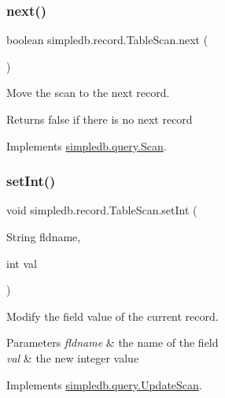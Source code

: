 \subsubsection{\texorpdfstring{next()}{next()}}
{\footnotesize\ttfamily boolean simpledb.\+record.\+Table\+Scan.\+next (\begin{DoxyParamCaption}{ }\end{DoxyParamCaption})\hspace{0.3cm}{\ttfamily [inline]}}

Move the scan to the next record. \begin{DoxyReturn}{Returns}
false if there is no next record 
\end{DoxyReturn}


Implements \hyperlink{interfacesimpledb_1_1query_1_1Scan_a5fc77b7c76d91f89f6c09ac4f15ef351}{simpledb.\+query.\+Scan}.

\mbox{\label{classsimpledb_1_1record_1_1TableScan_af36f97fd4163b889c0e3d76a824406c2}} 
\subsubsection{\texorpdfstring{set\+Int()}{setInt()}}
{\footnotesize\ttfamily void simpledb.\+record.\+Table\+Scan.\+set\+Int (\begin{DoxyParamCaption}\item[{String}]{fldname,  }\item[{int}]{val }\end{DoxyParamCaption})\hspace{0.3cm}{\ttfamily [inline]}}

Modify the field value of the current record. 
\begin{DoxyParams}{Parameters}
{\em fldname} & the name of the field \\
\hline
{\em val} & the new integer value \\
\hline
\end{DoxyParams}


Implements \hyperlink{interfacesimpledb_1_1query_1_1UpdateScan_ad866b1c21bbe8f0442a8779a6240c069}{simpledb.\+query.\+Update\+Scan}.

\mbox{\label{classsimpledb_1_1record_1_1TableScan_a0d7d00cd93ce179297abf17b5900b750}} 

